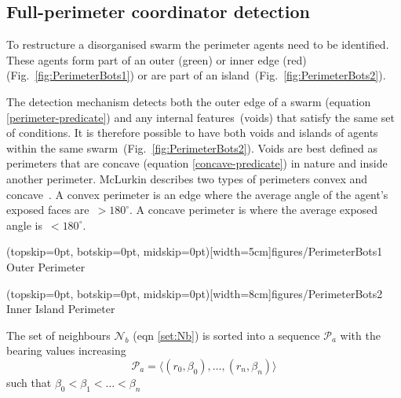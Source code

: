 \documentclass{ieeeaccess}
\begin{document}
\subsection{Full-perimeter coordinator detection}\label{sec:PerimeterAgentDetection} 
To restructure a disorganised swarm the perimeter agents need to be identified. These agents form part of an outer ({\color{green}green}) or inner edge ({\color{red}red}) (Fig.~\ref{fig:PerimeterBots1}) or are part of an island~(Fig.~\ref{fig:PerimeterBots2}).

The detection mechanism detects both the outer edge of a swarm (equation
\ref{perimeter-predicate})  and any internal features~(voids) that satisfy the same
set of conditions. It is therefore possible to have both voids and islands of
agents within the same swarm~(Fig.~\ref{fig:PerimeterBots2}). Voids are best
defined as perimeters that are concave (equation \ref{concave-predicate}) in nature and inside another perimeter. McLurkin describes two types of perimeters convex and concave~\cite{MD:09}. A convex perimeter is an edge where the average angle of the agent's exposed faces are~$> 180^\circ$. A concave perimeter is where the average exposed angle is~$< 180^\circ$.

\Figure[t!](topskip=0pt, botskip=0pt, midskip=0pt)[width=5cm]{figures/PerimeterBots1}
{Outer Perimeter\label{fig:PerimeterBots1}}

\Figure[t!](topskip=0pt, botskip=0pt, midskip=0pt)[width=8cm]{figures/PerimeterBots2}
{Inner Island Perimeter\label{fig:PerimeterBots2}}


The set of neighbours $\mathcal N_b$ (eqn \ref{set:Nb}) is sorted into a
sequence $\mathcal P_a$ with the bearing values
increasing
\begin{equation}
	\mathcal P_a = \langle (r_0,\beta_0),\ldots,(r_n,\beta_n) \rangle
\end{equation}
such that $\beta_0 < \beta_1 < \ldots < \beta_n$
\end{document}
